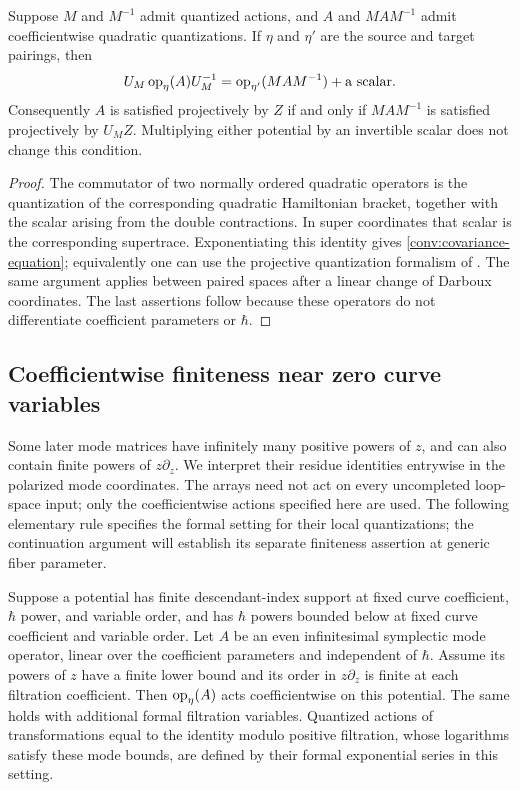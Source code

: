 \begin{lemma}\label{conv:covariance}
Suppose $M$ and $M^{-1}$ admit quantized actions, and $A$ and $MAM^{-1}$
admit coefficientwise quadratic quantizations.  If $\eta$ and $\eta'$
are the source and target pairings, then
\begin{equation}
 U_M\operatorname{op}_\eta(A)U_M^{-1}
        =\operatorname{op}_{\eta'}(MAM^{-1})+\text{a scalar}.
 \label{conv:covariance-equation}
\end{equation}
Consequently $A$ is satisfied projectively by $Z$ if and only if
$MAM^{-1}$ is satisfied projectively by $U_M Z$.
Multiplying either potential by an invertible scalar does not change this
condition.
\end{lemma}

\begin{proof}
The commutator of two normally ordered quadratic operators is the
quantization of the corresponding quadratic Hamiltonian bracket, together
with the scalar arising from the double contractions.  In super
coordinates that scalar is the corresponding supertrace.  Exponentiating
this identity gives \eqref{conv:covariance-equation}; equivalently one can
use the projective quantization formalism of \cite{GiventalQuant}.
The same argument applies between paired spaces after a linear change of
Darboux coordinates.  The last assertions follow because these operators
do not differentiate coefficient parameters or $\hbar$.
\end{proof}

\subsection{Coefficientwise finiteness near zero curve variables}

Some later mode matrices have infinitely many positive powers of $z$,
and can also contain finite powers of $z\partial_z$.  We interpret their
residue identities entrywise in the polarized mode coordinates.  The
arrays need not act on every uncompleted loop-space input; only the
coefficientwise actions specified here are used.  The
following elementary rule specifies the formal setting for their local
quantizations; the continuation argument will establish its separate
finiteness assertion at generic fiber parameter.

\begin{lemma}\label{conv:finite-support}
Suppose a potential has finite descendant-index support at fixed curve
coefficient, $\hbar$ power, and variable order, and has $\hbar$ powers
bounded below at fixed curve coefficient and variable order.  Let $A$ be
an even infinitesimal symplectic mode operator, linear over the coefficient
parameters and independent of $\hbar$.  Assume its powers of $z$ have a
finite lower bound and its order in $z\partial_z$ is finite at each
filtration coefficient.  Then $\operatorname{op}_\eta(A)$ acts coefficientwise on this
potential.  The same holds with additional formal filtration variables.
Quantized actions of transformations equal to the identity modulo
positive filtration, whose logarithms satisfy these mode bounds, are
defined by their formal exponential series in this setting.
\end{lemma}

